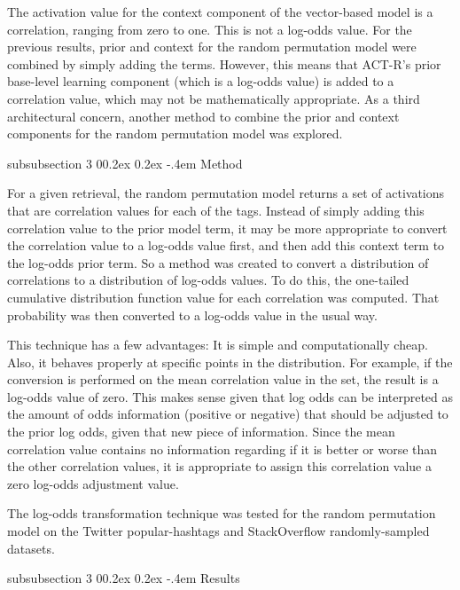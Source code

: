 \documentclass[man,floatsintext,donotrepeattitle]{apa6}
\makeatletter
\renewcommand{\subsubsection}{%
  \@startsection
  {subsubsection}%
  {3}%
  {\parindent}%
  {0\baselineskip \@plus 0.2ex \@minus 0.2ex}%
  {-.4em}%
  {\normalfont\normalsize\bfseries\addperi}}
\makeatother
\begin{document}
The activation value for the context component of the vector-based model is a correlation, ranging from zero to one.
This is not a log-odds value.
For the previous results, prior and context for the random permutation model were combined by simply adding the terms.
However, this means that ACT-R's prior base-level learning component (which is a log-odds value) is added to a correlation value, which may not be mathematically appropriate.
As a third architectural concern, another method to combine the prior and context components for the random permutation model was explored.

\subsubsection{Method}

For a given retrieval, the random permutation model returns a set of activations that are correlation values for each of the tags.
Instead of simply adding this correlation value to the prior model term, it may be more appropriate to convert the correlation value to a log-odds value first, and then add this context term to the log-odds prior term.
So a method was created to convert a distribution of correlations to a distribution of log-odds values.
To do this, the one-tailed cumulative distribution function value for each correlation was computed.
That probability was then converted to a log-odds value in the usual way. 

This technique has a few advantages: 
It is simple and computationally cheap.
Also, it behaves properly at specific points in the distribution.
For example, if the conversion is performed on the mean correlation value in the set, the result is a log-odds value of zero.
This makes sense given that log odds can be interpreted as the amount of odds information (positive or negative) that should be adjusted to the prior log odds, given that new piece of information.
Since the mean correlation value contains no information regarding if it is better or worse than the other correlation values, it is appropriate to assign this correlation value a zero log-odds adjustment value.

The log-odds transformation technique was tested for the random permutation model on the Twitter popular-hashtags and StackOverflow randomly-sampled datasets.

\subsubsection{Results}
\end{document}
